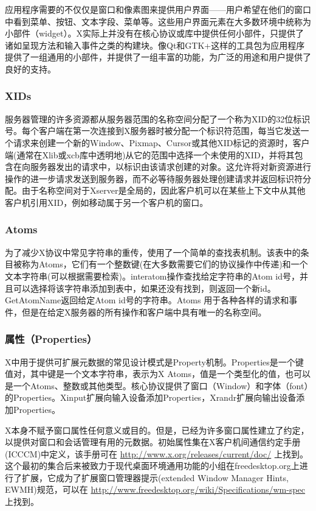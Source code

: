 应用程序需要的不仅仅是窗口和像素图来提供用户界面——用户希望在他们的窗口中看到菜单、按钮、文本字段、菜单等。这些用户界面元素在大多数环境中统称为小部件（widget）。X实际上并没有在核心协议或库中提供任何小部件，只提供了诸如呈现方法和输入事件之类的构建块。像Qt和GTK+这样的工具包为应用程序提供了一组通用的小部件，并提供了一组丰富的功能，为广泛的用途和用户提供了良好的支持。

\subsubsection{XIDs}

服务器管理的许多资源都从服务器范围的名称空间分配了一个称为XID的32位标识号。每个客户端在第一次连接到X服务器时被分配一个标识符范围，每当它发送一个请求来创建一个新的Window、Pixmap、Cursor或其他XID标记的资源时，客户端(通常在Xlib或xcb库中透明地)从它的范围中选择一个未使用的XID，并将其包含在向服务器发出的请求中，以标识由该请求创建的对象。这允许将对新资源进行操作的进一步请求发送到服务器，而不必等待服务器处理创建请求并返回标识符分配。由于名称空间对于Xserver是全局的，因此客户机可以在某些上下文中从其他客户机引用XID，例如移动属于另一个客户机的窗口。

\subsubsection{Atoms}

为了减少X协议中常见字符串的重传，使用了一个简单的查找表机制。该表中的条目被称为Atoms，它们有一个整数键(在大多数需要它们的协议操作中传递)和一个文本字符串(可以根据需要检索)。interatom操作查找给定字符串的Atom id号，并且可以选择将该字符串添加到表中，如果还没有找到，则返回一个新id。GetAtomName返回给定Atom id号的字符串。Atoms 用于各种各样的请求和事件，但是在给定X服务器的所有操作和客户端中具有唯一的名称空间。

\subsubsection{属性（Properties）}

X中用于提供可扩展元数据的常见设计模式是Property机制。Properties是一个键值对，其中键是一个文本字符串，表示为X Atoms，值是一个类型化的值，也可以是一个Atoms、整数或其他类型。核心协议提供了窗口（Window）和字体（font）的Properties。Xinput扩展向输入设备添加Properties，Xrandr扩展向输出设备添加Properties。

X本身不赋予窗口属性任何意义或目的。但是，已经为许多窗口属性建立了约定，以提供对窗口和会话管理有用的元数据。初始属性集在X客户机间通信约定手册(ICCCM)中定义，该手册可在 \href{http://www.x.org/releases/current/doc/}{http://www.x.org/releases/current/doc/} 上找到。这个最初的集合后来被致力于现代桌面环境通用功能的小组在freedesktop.org上进行了扩展，它成为了扩展窗口管理器提示(extended Window Manager Hints, EWMH)规范，可以在 \href{http://www.freedesktop.org/wiki/Specifications/wm-spec}{http://www.freedesktop.org/wiki/Specifications/wm-spec} 上找到。

